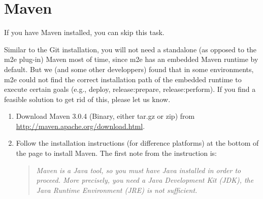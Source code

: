 
\section{Maven}

If you have Maven installed, you can skip this task.

Similar to the Git installation, you will not need a standalone (as opposed to
the m2e plug-in) Maven most of time, since m2e has an embedded Maven runtime by
default. But we (and some other developpers) found that in some environments,
m2e could not find the correct installation path of the embedded runtime to
execute certain goals (e.g., deploy, release:prepare, release:perform). If you
find a feasible solution to get rid of this, please let us know.

\begin{enumerate}

\item Download Maven 3.0.4 (Binary, either tar.gz or zip) from
\url{http://maven.apache.org/download.html}.

\item Follow the installation instructions (for difference platforms) at the
bottom of the page to install Maven. The first note from the instruction is:

\begin{quote}
\emph{Maven is a Java tool, so you must have Java installed in order to
proceed. More precisely, you need a Java Development Kit (JDK), the Java
Runtime Environment (JRE) is not sufficient.}
\end{quote}
\end{enumerate}